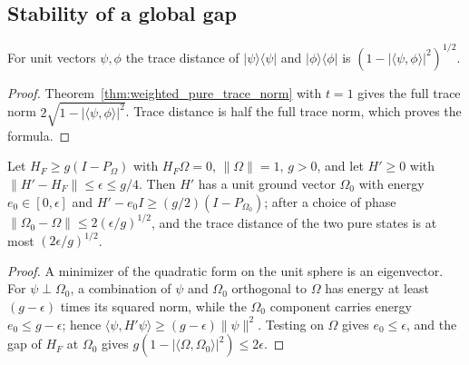 \subsection{Stability of a global gap}
\label{sec:gap_perturbation}

\begin{lemma}
    \label{lem:pure_trace_distance}
    \leanok
    For unit vectors $\psi,\phi$ the trace distance of
    $|\psi\rangle\langle\psi|$ and $|\phi\rangle\langle\phi|$ is
    $(1-|\langle\psi,\phi\rangle|^2)^{1/2}$.
\end{lemma}
\begin{proof}\leanok
    Theorem~\ref{thm:weighted_pure_trace_norm} with $t=1$ gives the full
    trace norm $2\sqrt{1-|\langle\psi,\phi\rangle|^2}$.
    Trace distance is half the full trace norm, which proves the formula.
\end{proof}

\begin{theorem}
    \label{thm:gap_perturbation}
    \leanok
    Let $H_F\ge g(I-P_\Omega)$ with $H_F\Omega=0$, $\|\Omega\|=1$, $g>0$, and
    let $H'\ge0$ with $\|H'-H_F\|\le\epsilon\le g/4$. Then $H'$ has a unit
    ground vector $\Omega_0$ with energy $e_0\in[0,\epsilon]$ and
    $H'-e_0I\ge(g/2)(I-P_{\Omega_0})$; after a choice of phase
    $\|\Omega_0-\Omega\|\le2(\epsilon/g)^{1/2}$, and the trace distance of the
    two pure states is at most $(2\epsilon/g)^{1/2}$.
\end{theorem}
\begin{proof}\leanok
    A minimizer of the quadratic form on the unit sphere is an eigenvector.
    For $\psi\perp\Omega_0$, a combination of $\psi$ and $\Omega_0$ orthogonal
    to $\Omega$ has energy at least $(g-\epsilon)$ times its squared norm,
    while the $\Omega_0$ component carries energy $e_0\le g-\epsilon$; hence
    $\langle\psi,H'\psi\rangle\ge(g-\epsilon)\|\psi\|^2$. Testing on $\Omega$
    gives $e_0\le\epsilon$, and the gap of $H_F$ at $\Omega_0$ gives
    $g(1-|\langle\Omega,\Omega_0\rangle|^2)\le2\epsilon$.
\end{proof}
